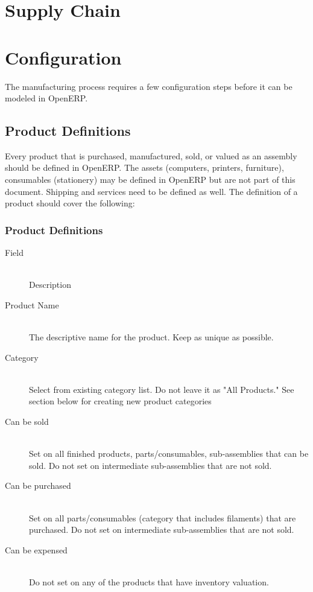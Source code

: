 %
%
%
%
%

\section{Supply Chain}
\begin{center}
\end{center}


\section{Configuration}
The manufacturing process requires a few configuration steps before it can be modeled in OpenERP.

\subsection{Product Definitions}
Every product that is purchased, manufactured, sold, or valued as an assembly should be defined in OpenERP. The assets (computers, printers, furniture), consumables (stationery) may be defined in OpenERP but are not part of this document. Shipping and services need to be defined as well.
The definition of a product should cover the following:
\subsubsection{Product Definitions}
\begin{description}
\item[Field] \hfill \\
Description
\item[Product Name] \hfill \\
The descriptive name for the product. Keep as unique as possible.
\item[Category] \hfill \\
Select from existing category list. Do not leave it as "All Products." See section below for creating new product categories 
\item[Can be sold] \hfill \\
Set on all finished products, parts/consumables, sub-assemblies that can be sold. Do not set on intermediate sub-assemblies that are not sold.
\item[Can be purchased] \hfill \\
Set on all parts/consumables (category that includes filaments) that are purchased. Do not set on intermediate sub-assemblies that are not sold.
\item[Can be expensed] \hfill \\
Do not set on any of the products that have inventory valuation.
\end{description}

